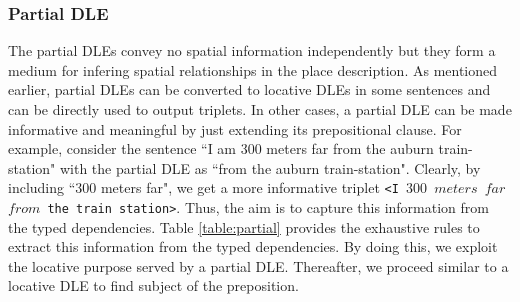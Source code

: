 \documentclass{acm_proc_article-sp}
\begin{document}
\subsubsection*{Partial DLE}
The partial DLEs convey no spatial information independently but they form a medium for infering spatial relationships in the place description. As mentioned earlier, partial DLEs can be converted to locative DLEs in some sentences and can be directly used to output triplets. In other cases, a partial DLE can be made informative and meaningful by just extending its prepositional clause. For example, consider the sentence ``I am 300 meters far from the auburn train-station" with the partial DLE as ``from the auburn train-station". Clearly, by including ``300 meters far", we get a more informative triplet \texttt{<I $300$ $meters$ $far$ $from$ the train station>}. Thus, the aim is to capture this information from the typed dependencies. Table \ref{table:partial} provides the exhaustive rules to extract this information from the typed dependencies. By doing this, we exploit the locative purpose served by a partial DLE. Thereafter, we proceed similar to a locative DLE to find subject of the preposition.



\end{document}
